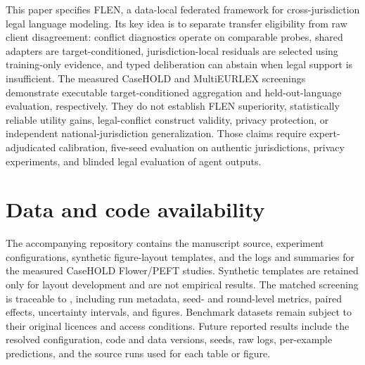 \documentclass[preprint,12pt,authoryear]{elsarticle}
\begin{document}
This paper specifies FLEN, a data-local federated framework for cross-jurisdiction legal language modeling. Its key idea is to separate transfer eligibility from raw client disagreement: conflict diagnostics operate on comparable probes, shared adapters are target-conditioned, jurisdiction-local residuals are selected using training-only evidence, and typed deliberation can abstain when legal support is insufficient. The measured CaseHOLD and MultiEURLEX screenings demonstrate executable target-conditioned aggregation and held-out-language evaluation, respectively. They do not establish FLEN superiority, statistically reliable utility gains, legal-conflict construct validity, privacy protection, or independent national-jurisdiction generalization. Those claims require expert-adjudicated calibration, five-seed evaluation on authentic jurisdictions, privacy experiments, and blinded legal evaluation of agent outputs.

\section*{Data and code availability}
The accompanying repository contains the manuscript source, experiment configurations, synthetic figure-layout templates, and the logs and summaries for the measured CaseHOLD Flower/PEFT studies. Synthetic templates are retained only for layout development and are not empirical results. The matched screening is traceable to , including run metadata, seed- and round-level metrics, paired effects, uncertainty intervals, and figures. Benchmark datasets remain subject to their original licences and access conditions. Future reported results include the resolved configuration, code and data versions, seeds, raw logs, per-example predictions, and the source runs used for each table or figure.



\end{document}
